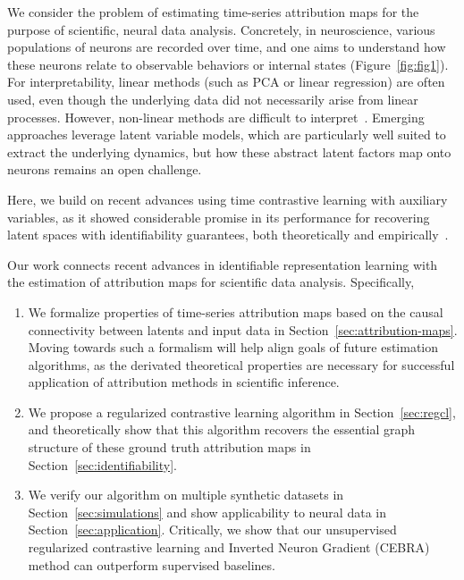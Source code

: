     We consider the problem of estimating time-series attribution maps for the purpose of scientific, neural data analysis.
    Concretely, in neuroscience, various populations of neurons are recorded over time, and one aims to understand how these neurons relate to observable behaviors or internal states (Figure~\ref{fig:fig1}). For interpretability, linear methods (such as PCA or linear regression) are often used, even though the underlying data did not necessarily arise from linear processes. However, non-linear methods are difficult to interpret~\citep{breen2018interpreting,samek2019explainable}.
    Emerging approaches leverage latent variable models, which are particularly well suited to extract the underlying dynamics, but how these abstract latent factors map onto neurons remains an open challenge. 
    
    Here, we build on recent advances using time contrastive learning with auxiliary variables, as it showed considerable promise in its performance for recovering latent spaces with identifiability guarantees, both theoretically and empirically~\citep{hyvarinen2016unsupervised,hyvarinen2019nonlinear,schneider2023cebra,zimmermann2021contrastive}. 

    Our work connects recent advances in identifiable representation learning with the estimation of attribution maps for scientific data analysis. Specifically,
    \vspace{-5pt}
    \begin{enumerate}
    \setlength{\itemsep}{0pt}
    \setlength{\parskip}{0pt}
        \item We formalize properties of time-series attribution maps based on the causal connectivity between latents and input data in Section~\ref{sec:attribution-maps}. Moving towards such a formalism will help align goals of future estimation algorithms, as the derivated theoretical properties are necessary for successful application of attribution methods in scientific inference. 
        \item We propose a regularized contrastive learning algorithm in Section~\ref{sec:regcl}, and theoretically show that this algorithm recovers the essential graph structure of these ground truth attribution maps in Section~\ref{sec:identifiability}.
        \item We verify our algorithm on multiple synthetic datasets in Section~\ref{sec:simulations} and show applicability to neural data in Section~\ref{sec:application}. Critically, we show that our unsupervised regularized contrastive learning and Inverted Neuron Gradient (CEBRA) method can outperform supervised baselines.
    \end{enumerate}
    

